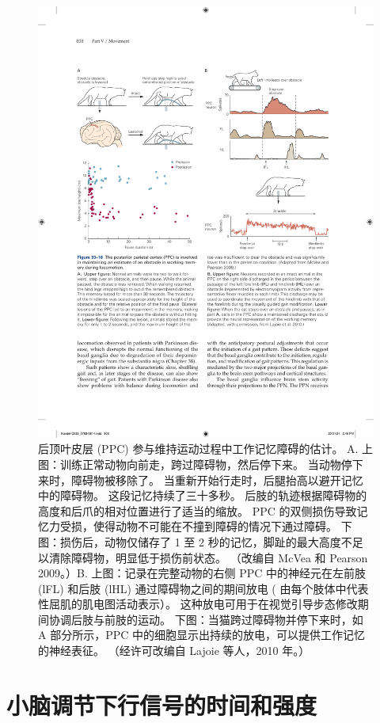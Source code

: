 \begin{figure}[htbp]
	\centering
	\includegraphics[width=0.95\linewidth]{chap33/fig_33_16}
	\caption{后顶叶皮层 (PPC) 参与维持运动过程中工作记忆障碍的估计。 A. 上图：训练正常动物向前走，跨过障碍物，然后停下来。 当动物停下来时，障碍物被移除了。 当重新开始行走时，后腿抬高以避开记忆中的障碍物。 这段记忆持续了三十多秒。 后肢的轨迹根据障碍物的高度和后爪的相对位置进行了适当的缩放。 PPC 的双侧损伤导致记忆力受损，使得动物不可能在不撞到障碍的情况下通过障碍。 下图：损伤后，动物仅储存了 1 至 2 秒的记忆，脚趾的最大高度不足以清除障碍物，明显低于损伤前状态。 （改编自 McVea 和 Pearson 2009。）B. 上图：记录在完整动物的右侧 PPC 中的神经元在左前肢 (lFL) 和后肢 (lHL) 通过障碍物之间的期间放电 ( 由每个肢体中代表性屈肌的肌电图活动表示）。 这种放电可用于在视觉引导步态修改期间协调后肢与前肢的运动。 下图：当猫跨过障碍物并停下来时，如 A 部分所示，PPC 中的细胞显示出持续的放电，可以提供工作记忆的神经表征。 （经许可改编自 Lajoie 等人，2010 年。）}
	\label{fig:33_16}
\end{figure}



\section{小脑调节下行信号的时间和强度}


